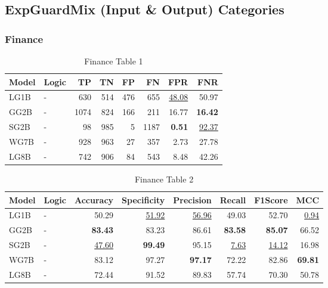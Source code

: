 \documentclass{article}
\begin{document}

\subsection{ExpGuardMix (Input \& Output) Categories}

\subsubsection{Finance}

\begin{table}[H]
\centering
\begin{tabular}{llrrrrrr}
\toprule
 Model          & Logic   &   TP &   TN &   FP &   FN &   FPR &   FNR \\
\midrule

 LG1B    & -       &  630 &  514 &  476 &  655 & \underline{48.08} & 50.97             \\
 GG2B    & -       & 1074 &  824 &  166 &  211 & 16.77             & \textbf{16.42}    \\
 SG2B    & -       &   98 &  985 &    5 & 1187 & \textbf{0.51}     & \underline{92.37} \\
 WG7B    & -       &  928 &  963 &   27 &  357 & 2.73              & 27.78             \\
 LG8B    & -       &  742 &  906 &   84 &  543 & 8.48              & 42.26             \\

\bottomrule
\end{tabular}
\caption{\label{tab:widgets}Finance Table 1}
\end{table}

\begin{table}[H]
\begin{tabular}{llrrrrrr}
\toprule
 Model          & Logic   &   Accuracy &   Specificity &   Precision &   Recall &   F1Score &      MCC \\
\midrule

 LG1B    & -       & 50.29             & \underline{51.92} & \underline{56.96} & 49.03            & 52.70             & \underline{0.94} \\
 GG2B    & -       & \textbf{83.43}    & 83.23             & 86.61             & \textbf{83.58}   & \textbf{85.07}    & 66.52            \\
 SG2B    & -       & \underline{47.60} & \textbf{99.49}    & 95.15             & \underline{7.63} & \underline{14.12} & 16.98            \\
 WG7B    & -       & 83.12             & 97.27             & \textbf{97.17}    & 72.22            & 82.86             & \textbf{69.81}   \\
 LG8B    & -       & 72.44             & 91.52             & 89.83             & 57.74            & 70.30             & 50.78            \\

\bottomrule
\end{tabular}
\caption{\label{tab:xstest2}Finance Table 2}
\end{table}
\end{document}
